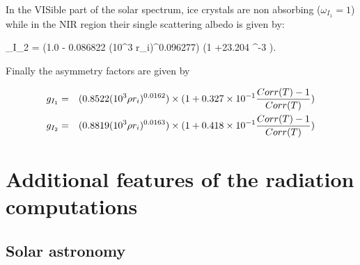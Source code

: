 In the VISible part of the solar spectrum, ice crystals are non absorbing
($\omega_{I_1}=1$) while in the NIR region their single scattering albedo is
given by:

\medskip
\be
\omega_{I_2} = (1.0 - 0.086822 (10^3 \rho r_i)^{0.096277}) \times (1 +23.204 ^{-3} ).
\ee
\medskip

Finally the asymmetry factors are given by

\medskip
\begin{eqnarray}
g_{I_1} &=& (0.8522 (10^3 \rho r_i)^{0.0162})\times (1 + 0.327 \times 10^{-1} \frac{Corr(T)-1}{Corr(T)}) \cr
g_{I_2} &=& (0.8819 (10^3 \rho r_i)^{0.0163})\times (1 + 0.418 \times 10^{-1} \frac{Corr(T)-1}{Corr(T)})
\end{eqnarray}
\medskip

%
\section{Additional features of the radiation computations}
\label{section4}
%

%
\subsection{Solar astronomy}
%

